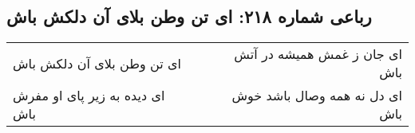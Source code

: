 \begin{center}
\section*{رباعی شماره ۲۱۸: ای تن وطن بلای آن دلکش باش}
\label{sec:sh218}
\begin{longtable}{l p{0.5cm} r}
ای تن وطن بلای آن دلکش باش
&&
ای جان ز غمش همیشه در آتش باش
\\
ای دیده به زیر پای او مفرش باش
&&
ای دل نه همه وصال باشد خوش باش
\\
\end{longtable}
\end{center}
